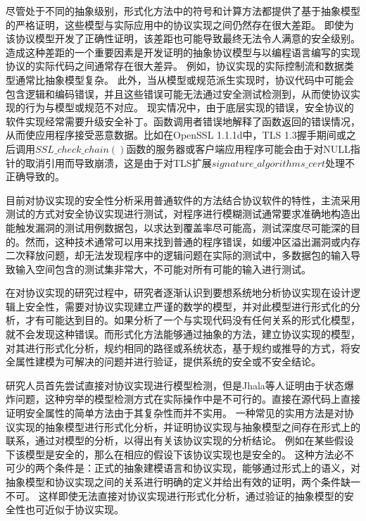 尽管处于不同的抽象级别，形式化方法中的符号和计算方法都提供了基于抽象模型的严格证明，这些模型与实际应用中的协议实现之间仍然存在很大差距。 即使为该协议模型开发了正确性证明，该差距也可能导致最终无法令人满意的安全级别。 造成这种差距的一个重要因素是开发证明的抽象协议模型与以编程语言编写的实现协议的实际代码之间通常存在很大差异。 例如，协议实现的实际控制流和数据类型通常比抽象模型复杂。 此外，当从模型或规范派生实现时，协议代码中可能会包含逻辑和编码错误，并且这些错误可能无法通过安全测试检测到，从而使协议实现的行为与模型或规范不对应。 现实情况中，由于底层实现的错误，安全协议的软件实现经常需要升级安全补丁。函数调用者错误地解释了函数返回的错误情况，从而使应用程序接受恶意数据。比如在OpenSSL 1.1.1d中，TLS 1.3握手期间或之后调用$SSL\_check\_chain()$函数的服务器或客户端应用程序可能会由于对NULL指针的取消引用而导致崩溃，这是由于对TLS扩展$signature\_algorithms\_cert$处理不正确导致的\cite{cve2020}。

目前对协议实现的安全性分析采用普通软件的方法结合协议软件的特性，主流采用测试的方式对安全协议实现进行测试，对程序进行模糊测试通常要求准确地构造出能触发漏洞的测试用例数据包，以求达到覆盖率尽可能高，测试深度尽可能深的目的。然而，这种技术通常可以用来找到普通的程序错误，如缓冲区溢出漏洞或内存二次释放问题，却无法发现程序中的逻辑问题在实际的测试中，多数据包的输入导致输入空间包含的测试集非常大，不可能对所有可能的输入进行测试。

在对协议实现的研究过程中，研究者逐渐认识到要想系统地分析协议实现在设计逻辑上安全性，需要对协议实现建立严谨的数学的模型，并对此模型进行形式化的分析，才有可能达到目的。如果分析了一个与实现代码没有任何关系的形式化模型，就不会发现这种错误。而形式化方法能够通过抽象的方法，建立协议实现的模型，对其进行形式化分析，规约相同的路径或系统状态，基于规约或推导的方式，将安全属性建模为可解决的问题并进行验证，提供系统的安全或不安全结论。




研究人员首先尝试直接对协议实现进行模型检测，但是Jhala等人证明由于状态爆炸问题，这种穷举的模型检测方式在实际操作中是不可行的\cite{jhala2009software}。直接在源代码上直接证明安全属性的简单方法由于其复杂性而并不实用。 一种常见的实用方法是对协议实现的抽象模型进行形式化分析，并证明协议实现与抽象模型之间存在形式上的联系，通过对模型的分析，以得出有关该协议实现的分析结论。 例如在某些假设下该模型是安全的，那么在相应的假设下该协议实现也是安全的。
这种方法必不可少的两个条件是：正式的抽象建模语言和协议实现，能够通过形式上的语义，对抽象模型和协议实现之间的关系进行明确的定义并给出有效的证明，两个条件缺一不可。 这样即使无法直接对协议实现进行形式化分析，通过验证的抽象模型的安全性也可近似于协议实现。 

